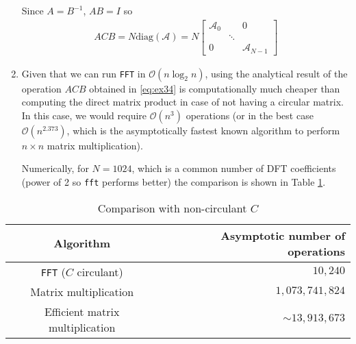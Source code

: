\documentclass{article}
\begin{document}
\begin{enumerate}
    Since $A= B^{-1}$, $AB=I$ so
    \begin{align}
        ACB = N\text{diag}(\mathcal{A}) =N\begin{bmatrix}
        \mathcal{A}_0 & &0 \\
        & \ddots & \\
        0& & \mathcal{A}_{N-1}
        \end{bmatrix}
        \label{eq:ex34}
    \end{align}
    \item Given that we can run \texttt{FFT} in $\mathcal{O}(n \log_2 n)$, using the analytical result of the operation $ACB$ obtained in \eqref{eq:ex34} is computationally much cheaper than computing the direct matrix product in case of not having a circular matrix. In this case, we would require $\mathcal{O}(n^3)$ operations (or in the best case $\mathcal{O}(n^{2.373})$, which is the asymptotically fastest known algorithm to perform $n\times n$ matrix multiplication).
    
    Numerically, for $N=1024$, which is a common number of DFT coefficients (power of 2 so \texttt{fft} performs better) the comparison is shown in Table \ref{tab:cv}.
\end{enumerate}

\begin{table}[ht]
  \centering
  \begin{tabular}{cr}
    \toprule
        Algorithm & Asymptotic number of operations \\
        \toprule
        \texttt{FFT} ($C$ circulant) & $10,240$ \\
        \midrule
         Matrix multiplication & $1,073,741,824$ \\
    Efficient matrix multiplication & $\sim13,913,673$ \\
    \bottomrule
    
  \end{tabular}

  \caption{Comparison with non-circulant $C$}
  \label{tab:cv}
\end{table}
\end{document}
